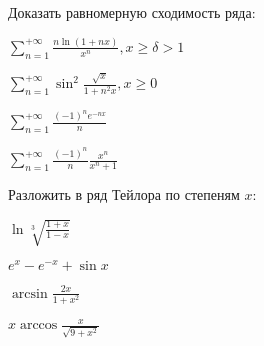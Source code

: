 \documentclass[russian]{article}
\begin{document}
Доказать равномерную сходимость ряда:

$\sum_{n = 1}^{+\infty} \frac{n \ln(1 + nx)}{x^n}, x \ge \delta > 1$

$\sum_{n = 1}^{+\infty} \sin^2{\frac{\sqrt{x}}{1 + n^2 x}}, x \ge 0$

$\sum_{n = 1}^{+\infty} \frac{(-1)^n e^{-nx}}{n}$

$\sum_{n = 1}^{+\infty} \frac{(-1)^n}{n} \frac{x^n}{x^n + 1}$

Разложить в ряд Тейлора по степеням $x$:

$\ln\sqrt[3]{\frac{1 + x}{1 - x}}$

$e^x - e^{-x} + \sin{x}$

$\arcsin \frac{2x}{1 + x^2}$

$x\arccos \frac{x}{\sqrt{9 + x^2}}$
\end{document}
